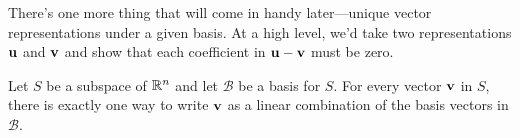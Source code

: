 \documentclass[../m073main.tex]{subfiles}
\begin{document}
There's one more thing that will come in handy later---unique vector representations under a given basis.
At a high level, we'd take two representations $\mathbf{u}$ and $\mathbf{v}$ and show that each coefficient in $\mathbf{u} - \mathbf{v}$ must be zero.

\begin{theorem}
	Let $S$ be a subspace of $\mathbb{R}^n$ and let $\mathcal{B}$ be a basis for $S$.
	For every vector $\mathbf{v}$ in $S$, there is exactly one way to write $\mathbf{v}$ as a linear combination of the basis vectors in $\mathcal{B}$.
\end{theorem}
\end{document}
